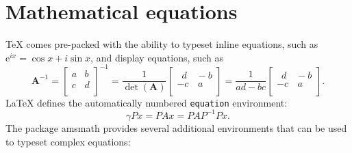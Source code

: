 \documentclass[
  digital,     %
  twoside,     %
  lof,         %
  lot,         %
]{fithesis4}
\begin{document}
\chapter{Mathematical equations}
\label{chap:matheq}
\TeX{} comes pre-packed with the ability to typeset inline
equations, such as $\mathrm{e}^{ix}=\cos x+i\sin x$, and display
equations, such as \[
  \mathbf{A}^{-1} = \begin{bmatrix}
  a & b \\ c & d \\
  \end{bmatrix}^{-1} =
  \frac{1}{\det(\mathbf{A})} \begin{bmatrix}
  \,\,\,d & \!\!-b \\ -c & \,a \\
  \end{bmatrix} =
  \frac{1}{ad - bc} \begin{bmatrix}
  \,\,\,d & \!\!-b \\ -c & \,a \\
  \end{bmatrix}.
\] \LaTeX{} defines the automatically numbered \texttt{equation}
environment:
\begin{equation}
  \gamma Px = PAx = PAP^{-1}Px.
\end{equation}
The package \textsf{amsmath} provides several additional
environments that can be used to typeset complex equations:
\end{document}
